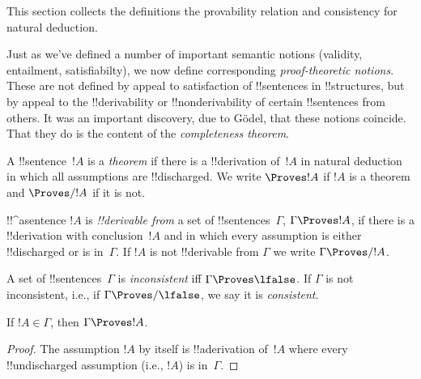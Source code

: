 \documentclass[../../../include/open-logic-section]{subfiles}
\begin{document}

\begin{editorial}
This section collects the definitions the provability relation
and consistency for natural deduction.
\end{editorial}

\begin{explain}
Just as we've defined a number of important semantic notions
(validity, entailment, satisfiabilty), we now define corresponding
\emph{proof-theoretic notions}.  These are not defined by appeal to
satisfaction of !!{sentence}s in !!{structure}s, but by appeal to the
!!{derivability} or !!{nonderivability} of certain !!{sentence}s from
others.  It was an important discovery, due to G\"odel, that these
notions coincide.  That they do is the content of the
\emph{completeness theorem}.
\end{explain}


\begin{defn}[Theorems]
A !!{sentence}~$!A$ is a \emph{theorem} if there is a !!{derivation}
of~$!A$ in natural deduction in which all assumptions are
!!{discharged}.  We write $\Proves !A$ if $!A$ is a theorem and
$\Proves/ !A$ if it is not.
\end{defn}

\begin{defn}[!!^{derivability}]
!!^a{sentence} $!A$ is \emph{!!{derivable} from} a set of
!!{sentence}s~$\Gamma$, $\Gamma \Proves !A$, if there is a
!!{derivation} with conclusion~$!A$ and in which every assumption
is either !!{discharged} or is in~$\Gamma$. If $!A$ is not
!!{derivable} from $\Gamma$ we write $\Gamma \Proves/ !A$.
\end{defn}

\begin{defn}[Consistency]
A set of !!{sentence}s~$\Gamma$ is \emph{inconsistent} iff $\Gamma
\Proves \lfalse$.  If $\Gamma$ is not inconsistent, i.e., if
$\Gamma \Proves/ \lfalse$, we say it is \emph{consistent}.
\end{defn}

\begin{prop}[Reflexivity]
If $!A \in \Gamma$, then $\Gamma \Proves !A$.
\end{prop}

\begin{proof}
The assumption $!A$ by itself is !!a{derivation} of~$!A$ where every
!!{undischarged} assumption (i.e., $!A$) is in~$\Gamma$.
\end{proof}
  
\end{document}
